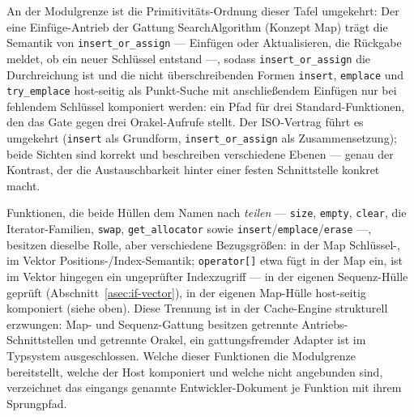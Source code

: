\noindent An der Modulgrenze ist die Primitivitäts-Ordnung dieser Tafel umgekehrt: Der eine
Einfüge-Antrieb der Gattung SearchAlgorithm (Konzept Map) trägt die Semantik von
\texttt{insert\_or\_assign} --- Einfügen oder
Aktualisieren, die Rückgabe meldet, ob ein neuer Schlüssel entstand ---, sodass
\texttt{insert\_or\_assign} die Durchreichung ist und die nicht überschreibenden Formen
\texttt{insert}, \texttt{emplace} und \texttt{try\_emplace} host-seitig als Punkt-Suche mit
anschließendem Einfügen nur bei fehlendem Schlüssel komponiert werden: ein Pfad für drei
Standard-Funktionen, den das Gate gegen drei Orakel-Aufrufe stellt. Der ISO-Vertrag führt es
umgekehrt (\texttt{insert} als Grundform, \texttt{insert\_or\_assign} als Zusammensetzung); beide
Sichten sind korrekt und beschreiben verschiedene Ebenen --- genau der Kontrast, der die
Austauschbarkeit hinter einer festen Schnittstelle konkret macht.

\noindent Funktionen, die beide Hüllen dem Namen nach \emph{teilen} --- \texttt{size}, \texttt{empty},
\texttt{clear}, die Iterator-Familien, \texttt{swap}, \texttt{get\_allocator} sowie
\texttt{insert}/\texttt{emplace}/\texttt{erase} ---, besitzen dieselbe Rolle, aber verschiedene
Bezugsgrößen: in der Map Schlüssel-, im Vektor Positions-/Index-Semantik; \texttt{operator[]} etwa
fügt in der Map ein, ist im Vektor hingegen ein ungeprüfter Indexzugriff --- in der eigenen
Sequenz-Hülle geprüft (Abschnitt~\ref{asec:if-vector}), in der eigenen Map-Hülle host-seitig
komponiert (siehe oben). Diese Trennung ist in der Cache-Engine strukturell erzwungen: Map- und
Sequenz-Gattung besitzen getrennte Antriebs-Schnittstellen und getrennte Orakel, ein
gattungsfremder Adapter ist im Typsystem ausgeschlossen. Welche dieser Funktionen die Modulgrenze
bereitstellt, welche der Host komponiert und welche nicht angebunden sind, verzeichnet das eingangs
genannte Entwickler-Dokument je Funktion mit ihrem Sprungpfad.
